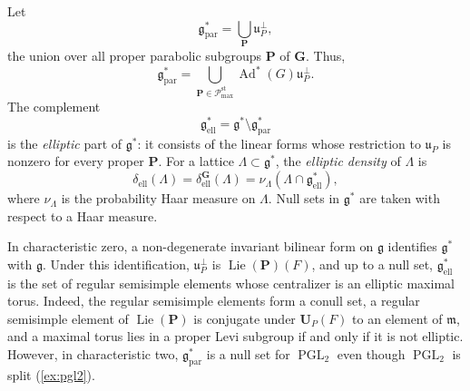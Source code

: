\documentclass[11pt,reqno]{amsart}
\numberwithin{equation}{section}
\theoremstyle{plain}
\theoremstyle{definition}
\theoremstyle{remark}
\theoremstyle{plain}
\newcommand{\Lat}{\mathcal{L}}   %
\newcommand{\dLat}{\Lambda}      %
\newcommand{\bG}{\mathbf{G}}     %
\newcommand{\bP}{\mathbf{P}}     %
\newcommand{\bU}{\mathbf{U}}     %
\newcommand{\g}{\mathfrak{g}}    %
\newcommand{\gd}{\mathfrak{g}^*} %
\newcommand{\uu}{\mathfrak{u}}   %
\newcommand{\m}{\mathfrak{m}}    %
\newcommand{\Ell}[2][]{#2_{#1\mathrm{ell}}}   %
\newcommand{\Par}[2][]{#2_{#1\mathrm{par}}}
\newcommand{\elld}[2][]{\delta_{\mathrm{ell}}^{#1}(#2)}  %
\newcommand{\Pc}{\mathscr{P}^{\mathrm{st}}_{\mathrm{max}}}    %
\DeclareMathOperator{\Ad}{Ad}
\DeclareMathOperator{\Lie}{Lie}
\DeclareMathOperator{\PGL}{PGL}
\begin{document}
Let
\[
\Par{\gd}=\bigcup_{\bP}\uu_P^\perp,
\]
the union over all proper parabolic subgroups $\bP$ of $\bG$. Thus,
\begin{equation}\label{eq:N}
\Par{\gd}=\bigcup_{\bP\in\Pc}\Ad^*(G)\uu_P^\perp.
\end{equation}
The complement
\begin{equation}\label{eq:E}
\Ell{\gd}=\gd\setminus\Par{\gd}
\end{equation}
is the \emph{elliptic} part of $\gd$: it consists of the linear forms whose restriction to $\uu_P$ is nonzero
for every proper $\bP$. For a lattice $\dLat\subset\gd$, the
\emph{elliptic density} of $\dLat$ is
\[
\elld{\dLat}=\elld[\bG]{\dLat}=\nu_{\dLat}(\dLat\cap\Ell{\gd}),
\]
where $\nu_{\dLat}$ is the probability Haar measure on $\dLat$.
Null sets in $\gd$ are taken with respect to a Haar measure.

In characteristic zero, a non-degenerate invariant bilinear form on $\g$ identifies $\gd$ with $\g$.
Under this identification, $\uu_P^\perp$ is $\Lie(\bP)(F)$, and up to a null set, $\Ell{\gd}$
is the set of regular semisimple elements whose centralizer is an elliptic maximal torus.
Indeed, the regular semisimple elements form a conull set, a regular
semisimple element of $\Lie(\bP)$ is conjugate under $\bU_P(F)$ to an
element of $\m$, and a maximal torus lies in a proper Levi subgroup if and
only if it is not elliptic.
However, in characteristic two, $\Par{\gd}$ is a null set for $\PGL_2$ even though $\PGL_2$ is split (\cref{ex:pgl2}).
\end{document}

